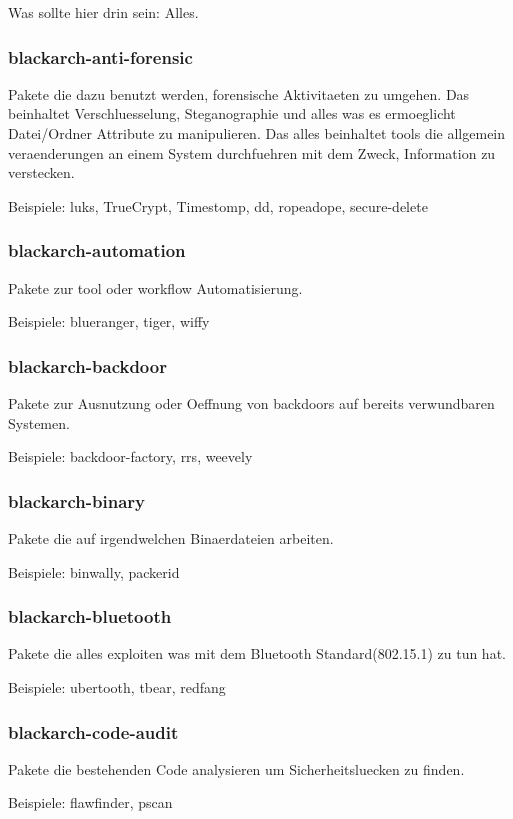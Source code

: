 \documentclass[a4paper, oneside, 11pt]{book}
\begin{document}
Was sollte hier drin sein: Alles.

\subsubsection{blackarch-anti-forensic}
Pakete die dazu benutzt werden, forensische Aktivitaeten zu umgehen. Das beinhaltet Verschluesselung, Steganographie 
und alles was es ermoeglicht Datei/Ordner Attribute zu manipulieren.
Das alles beinhaltet tools die allgemein veraenderungen an einem System durchfuehren mit dem Zweck,
Information zu verstecken. 

Beispiele: luks, TrueCrypt, Timestomp, dd, ropeadope, secure-delete

\subsubsection{blackarch-automation}
Pakete zur tool oder workflow Automatisierung.

Beispiele: blueranger, tiger, wiffy

\subsubsection{blackarch-backdoor}
Pakete zur Ausnutzung oder Oeffnung von backdoors auf bereits verwundbaren
Systemen.

Beispiele: backdoor-factory, rrs, weevely

\subsubsection{blackarch-binary}
Pakete die auf irgendwelchen Binaerdateien arbeiten.

Beispiele: binwally, packerid

\subsubsection{blackarch-bluetooth}
Pakete die alles exploiten was mit dem Bluetooth Standard(802.15.1) zu tun hat.

Beispiele: ubertooth, tbear, redfang

\subsubsection{blackarch-code-audit}
Pakete die bestehenden Code analysieren um Sicherheitsluecken zu finden.

Beispiele: flawfinder, pscan
\end{document}
